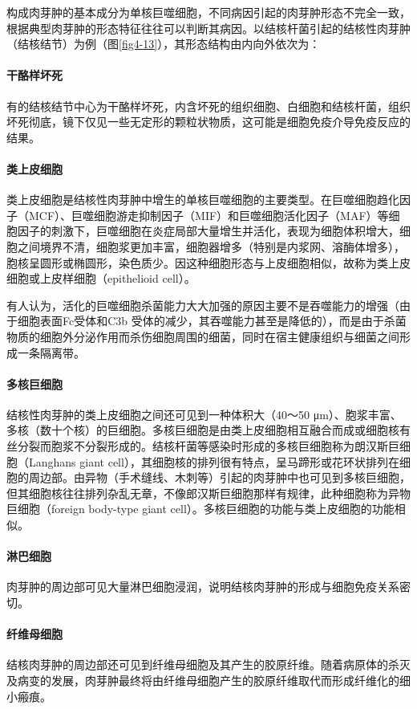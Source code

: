 构成肉芽肿的基本成分为单核巨噬细胞，不同病因引起的肉芽肿形态不完全一致，根据典型肉芽肿的形态特征往往可以判断其病因。以结核杆菌引起的结核性肉芽肿（结核结节）为例（图\ref{fig4-13}），其形态结构由内向外依次为：

\paragraph{干酪样坏死}
有的结核结节中心为干酪样坏死，内含坏死的组织细胞、白细胞和结核杆菌，组织坏死彻底，镜下仅见一些无定形的颗粒状物质，这可能是细胞免疫介导免疫反应的结果。

\paragraph{类上皮细胞}
类上皮细胞是结核性肉芽肿中增生的单核巨噬细胞的主要类型。在巨噬细胞趋化因子（MCF）、巨噬细胞游走抑制因子（MIF）和巨噬细胞活化因子（MAF）等细胞因子的刺激下，巨噬细胞在炎症局部大量增生并活化，表现为细胞体积增大，细胞之间境界不清，细胞浆更加丰富，细胞器增多（特别是内浆网、溶酶体增多），胞核呈圆形或椭圆形，染色质少。因这种细胞形态与上皮细胞相似，故称为类上皮细胞或上皮样细胞（epithelioid
cell）。

有人认为，活化的巨噬细胞杀菌能力大大加强的原因主要不是吞噬能力的增强（由于细胞表面Fc受体和C{3b}
受体的减少，其吞噬能力甚至是降低的），而是由于杀菌物质的细胞外分泌作用而杀伤细胞周围的细菌，同时在宿主健康组织与细菌之间形成一条隔离带。

\paragraph{多核巨细胞}
结核性肉芽肿的类上皮细胞之间还可见到一种体积大（40～50
μm）、胞浆丰富、多核（数十个核）的巨细胞。多核巨细胞是由类上皮细胞相互融合而成或细胞核有丝分裂而胞浆不分裂形成的。结核杆菌等感染时形成的多核巨细胞称为朗汉斯巨细胞（Langhans
giant
cell），其细胞核的排列很有特点，呈马蹄形或花环状排列在细胞的周边部。由异物（手术缝线、木刺等）引起的肉芽肿中也可见到多核巨细胞，但其细胞核往往排列杂乱无章，不像郎汉斯巨细胞那样有规律，此种细胞称为异物巨细胞（foreign
body-type giant cell）。多核巨细胞的功能与类上皮细胞的功能相似。

\paragraph{淋巴细胞}
肉芽肿的周边部可见大量淋巴细胞浸润，说明结核肉芽肿的形成与细胞免疫关系密切。

\paragraph{纤维母细胞}
结核肉芽肿的周边部还可见到纤维母细胞及其产生的胶原纤维。随着病原体的杀灭及病变的发展，肉芽肿最终将由纤维母细胞产生的胶原纤维取代而形成纤维化的细小瘢痕。

